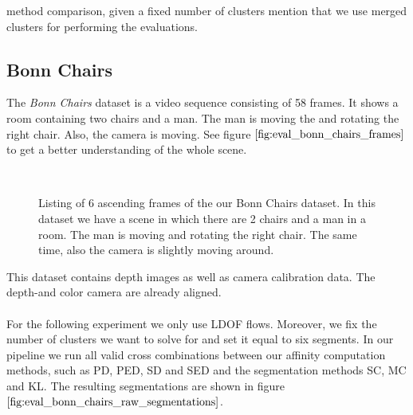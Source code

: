 
method comparison, given a fixed number of clusters
mention that we use merged clusters for performing the evaluations.

\subsection{Bonn Chairs}
The \textit{Bonn Chairs} dataset is a video sequence consisting of 58 frames. It shows a room containing two chairs and a man. The man is moving the and rotating the right chair. Also, the camera is moving. See figure $\ref{fig:eval_bonn_chairs_frames}$ to get a better understanding of the whole scene.
\begin{figure}[H]
\begin{center}
~
\end{center}
\caption[Bonn Chairs Dataset]{Listing of 6 ascending frames of the our Bonn Chairs dataset. In this dataset we have a scene in which there are 2 chairs and a man in a room. The man is moving and rotating the right chair. The same time, also the camera is slightly moving around.}
\label{fig:eval_bonn_chairs_frames}
\end{figure}
This dataset contains depth images as well as camera calibration data. The depth-and color camera are already aligned. \\ \\
For the following experiment we only use LDOF flows. Moreover, we fix the number of clusters we want to solve for and set it equal to six segments. In our pipeline we run all valid cross combinations between our affinity computation methods, such as PD, PED, SD and SED and the segmentation methods SC, MC and KL. The resulting segmentations are shown in figure $\ref{fig:eval_bonn_chairs_raw_segmentations}$.

